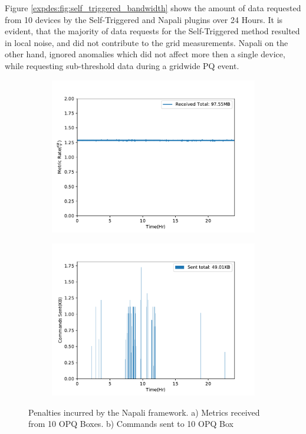 Figure \ref{expdes:fig:self_triggered_bandwidth} shows the amount of data requested from 10 devices by the Self-Triggered and Napali plugins over 24 Hours.
It is evident, that the majority of data requests for the Self-Triggered method resulted in local noise, and did not contribute to the grid measurements.
Napali on the other hand, ignored anomalies which did not affect more then a single device, while requesting sub-threshold data during a gridwide PQ event.

\begin{figure}[ht!]
    \centering
    \begin{subfigure}{.5\textwidth}
        \centering
        \includegraphics[width=1\linewidth]{img/napali_eval/napali_metric_bandwidth.pdf}
        \caption{}
        \label{expdes:fig:napali_metric_bandwidth}
    \end{subfigure}%
    \begin{subfigure}{.5\textwidth}
        \centering
        \includegraphics[width=1\linewidth]{img/napali_eval/napali_cmd_bandwidth.pdf}
        \caption{}
        \label{expdes:fig:napali_cmd_bandwidth}
    \end{subfigure}
    \caption{Penalties incurred by the Napali framework.
    a) Metrics received from 10 OPQ Boxes.
    b) Commands sent to 10 OPQ Box }
    \label{expdes:fig:napali_bandwidth_penalty}
\end{figure}

